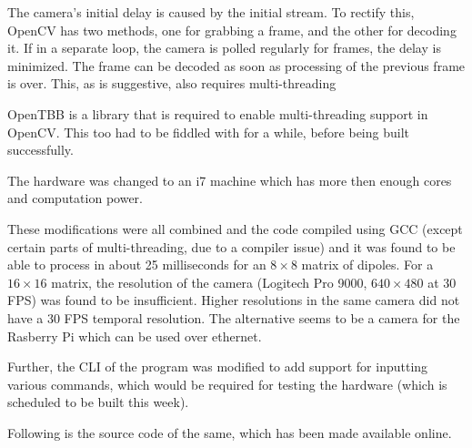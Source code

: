 		\par
		The camera's initial delay is caused by the initial stream. To rectify this, OpenCV has two methods, one for grabbing a frame, and the other for decoding it. If in a separate loop, the camera is polled regularly for frames, the delay is minimized. The frame can be decoded as soon as processing of the previous frame is over. This, as is suggestive, also requires multi-threading
		\par
		OpenTBB is a library that is required to enable multi-threading support in OpenCV. This too had to be fiddled with for a while, before being built successfully.
		\par
		The hardware was changed to an i7 machine which has more then enough cores and computation power.
		\par
		These modifications were all combined and the code compiled using GCC (except certain parts of multi-threading, due to a compiler issue) and it was found to be able to process in about 25 milliseconds for an $8 \times 8$ matrix of dipoles. For a $16 \times 16$ matrix, the resolution of the camera (Logitech Pro 9000, $640 \times 480$ at 30 FPS) was found to be insufficient. Higher resolutions in the same camera did not have a 30 FPS temporal resolution. The alternative seems to be a camera for the Rasberry Pi which can be used over ethernet.
		\par
		Further, the CLI of the program was modified to add support for inputting various commands, which would be required for testing the hardware (which is scheduled to be built this week).
		\par
		Following is the source code of the same, which has been made available online.
		
		
